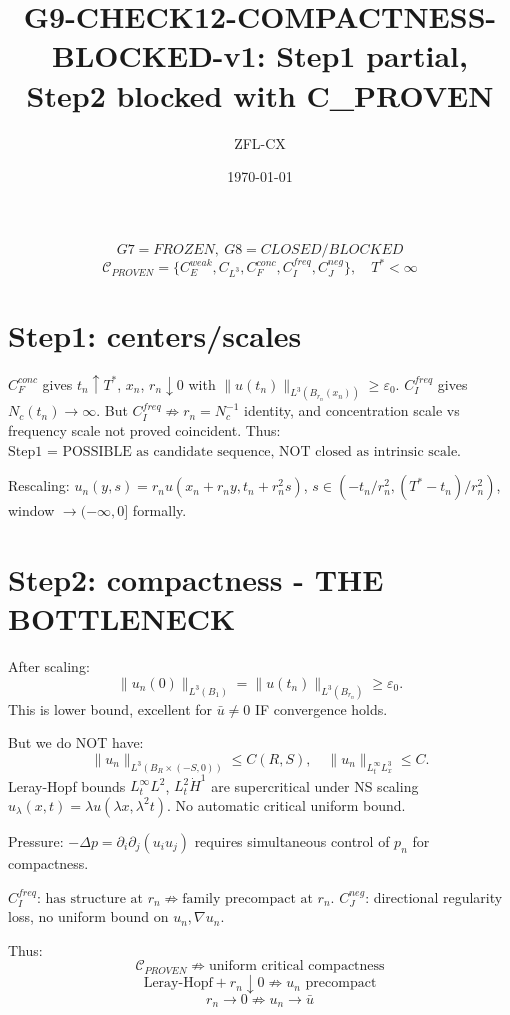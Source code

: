 \documentclass[11pt]{article}
\begin{document}
\title{G9-CHECK12-COMPACTNESS-BLOCKED-v1: Step1 partial, Step2 blocked with C\_PROVEN}
\author{ZFL-CX}\date{\today}\maketitle

\[
\boxed{G7=FROZEN,\ G8=CLOSED/BLOCKED}
\]
\[
\boxed{\mathcal C_{PROVEN}=\{C_E^{weak},C_{L^3},C_F^{conc},C_I^{freq},C_J^{neg}\},\quad T^*<\infty}
\]

\section{Step1: centers/scales}
$C_F^{conc}$ gives $t_n\uparrow T^*$, $x_n$, $r_n\downarrow0$ with $\|u(t_n)\|_{L^3(B_{r_n}(x_n))}\ge\varepsilon_0$.
$C_I^{freq}$ gives $N_c(t_n)\to\infty$.
But $\boxed{C_I^{freq}\not\Rightarrow r_n=N_c^{-1}}$ identity, and concentration scale vs frequency scale not proved coincident.
Thus: $\boxed{\text{Step1 = POSSIBLE as candidate sequence, NOT closed as intrinsic scale}}$.

Rescaling: $u_n(y,s)=r_nu(x_n+r_ny,t_n+r_n^2s)$, $s\in(-t_n/r_n^2,(T^*-t_n)/r_n^2)$, window $\to(-\infty,0]$ formally.

\section{Step2: compactness - THE BOTTLENECK}
After scaling:
\[
\|u_n(0)\|_{L^3(B_1)}=\|u(t_n)\|_{L^3(B_{r_n})}\ge\varepsilon_0.
\]
This is lower bound, excellent for $\bar u\neq0$ IF convergence holds.

But we do NOT have:
\[
\|u_n\|_{L^3(B_R\times(-S,0))}\le C(R,S),\quad \|u_n\|_{L^\infty_tL^3_x}\le C.
\]
Leray-Hopf bounds $L^\infty_tL^2$, $L^2_t\dot H^1$ are supercritical under NS scaling $u_\lambda(x,t)=\lambda u(\lambda x,\lambda^2t)$. No automatic critical uniform bound.

Pressure: $-\Delta p=\partial_i\partial_j(u_iu_j)$ requires simultaneous control of $p_n$ for compactness.

$C_I^{freq}$: $\boxed{\text{has structure at }r_n\not\Rightarrow\text{family precompact at }r_n}$.
$C_J^{neg}$: directional regularity loss, no uniform bound on $u_n,\nabla u_n$.

Thus:
\[
\boxed{\mathcal C_{PROVEN}\not\Rightarrow\text{uniform critical compactness}}
\]
\[
\boxed{\text{Leray-Hopf}+r_n\downarrow0\not\Rightarrow u_n\text{ precompact}}
\]
\[
\boxed{r_n\to0\not\Rightarrow u_n\to\bar u}
\]
\end{document}
